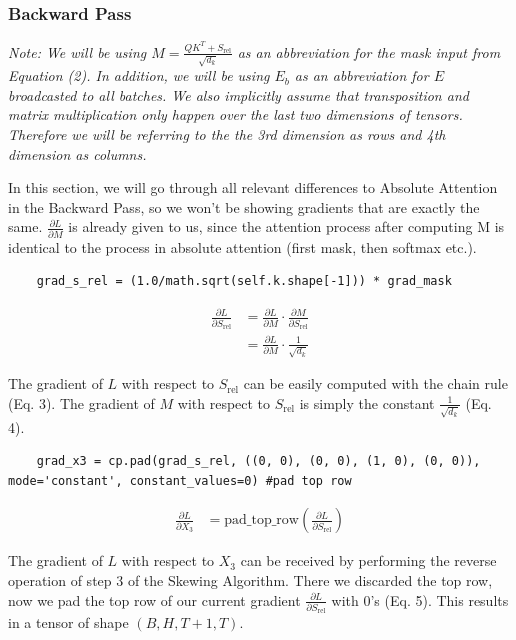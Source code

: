 \documentclass[a4paper,12pt]{extarticle}
\begin{document}
\subsubsection{Backward Pass}
\textit{Note: We will be using $M = \frac{QK^T+S_\text{rel}}{\sqrt{d_k}}$ as an abbreviation for the mask input from Equation (2). In addition, we will be using $E_b$ as an abbreviation for $E$ broadcasted to all batches. We also implicitly assume that transposition and matrix multiplication only happen over the last two dimensions of tensors. Therefore we will be referring to the the 3rd dimension as rows and 4th dimension as columns.}\newline

In this section, we will go through all relevant differences to Absolute Attention in the Backward Pass, so we won't be showing gradients that are exactly the same. $\frac{\partial L}{\partial M}$ is already given to us, since the attention process after computing M is identical to the process in absolute attention (first mask, then softmax etc.).\newline

\begin{lstlisting}
    grad_s_rel = (1.0/math.sqrt(self.k.shape[-1])) * grad_mask
\end{lstlisting}
\begin{align}
\frac{\partial L}{\partial S_\text{rel}}
&= \frac{\partial L}{\partial M} \cdot \frac{\partial M}{\partial S_\text{rel}} \\[0.15cm]
&= \frac{\partial L}{\partial M} \cdot \frac{1}{\sqrt{d_k}}
\end{align}

\raggedright The gradient of $L$ with respect to $S_\text{rel}$ can be easily computed with the chain rule (Eq. 3). The gradient of $M$ with respect to $S_\text{rel}$ is simply the constant $\frac{1}{\sqrt{d_k}}$ (Eq. 4). \newline
\vspace{0.1cm}
\begin{lstlisting}
    grad_x3 = cp.pad(grad_s_rel, ((0, 0), (0, 0), (1, 0), (0, 0)), mode='constant', constant_values=0) #pad top row
\end{lstlisting}
\begin{align}
\frac{\partial L}{\partial X_3}&=\text{pad\_top\_row}\left(\frac{\partial L}{\partial S_\text{rel}}\right)
\end{align}

The gradient of $L$ with respect to $X_3$ can be received by performing the reverse operation of step 3 of the Skewing Algorithm. There we discarded the top row, now we pad the top row of our current gradient $\frac{\partial L}{\partial S_\text{rel}}$ with 0's (Eq. 5). This results in a tensor of shape $(B, H, T + 1, T)$. \newline
\vspace{0.1cm}
\end{document}
